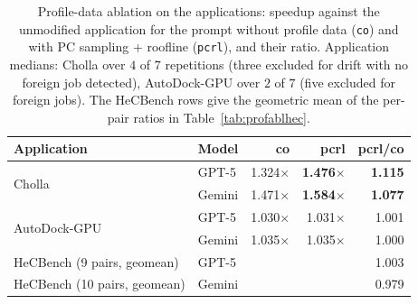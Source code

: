 \begin{table}[t]
\centering
\footnotesize
\caption{Profile-data ablation on the applications: speedup against the unmodified application for
  the prompt without profile data (\texttt{co}) and with PC sampling + roofline (\texttt{pcrl}), and
  their ratio. Application medians: Cholla over $4$ of $7$ repetitions (three excluded for drift with
  no foreign job detected), AutoDock-GPU over $2$ of $7$ (five excluded for foreign jobs). The
  HeCBench rows give the geometric mean of the per-pair ratios in Table~\ref{tab:profablhec}.}
\label{tab:profabl}
\setlength{\tabcolsep}{2pt}
\begin{tabular}{@{}llrrr@{}}
\toprule
\textbf{Application} & \textbf{Model} & \textbf{co} & \textbf{pcrl} & \textbf{pcrl/co} \\
\midrule
\multirow{2}{*}{Cholla}
  & GPT-5  & 1.324$\times$ & \textbf{1.476}$\times$ & \textbf{1.115} \\
  & Gemini & 1.471$\times$ & \textbf{1.584}$\times$ & \textbf{1.077} \\
\midrule
\multirow{2}{*}{AutoDock-GPU}
  & GPT-5  & 1.030$\times$ & 1.031$\times$ & 1.001 \\
  & Gemini & 1.035$\times$ & 1.035$\times$ & 1.000 \\
\midrule
HeCBench (9 pairs, geomean)  & GPT-5  & & & 1.003 \\
HeCBench (10 pairs, geomean) & Gemini & & & 0.979 \\
\bottomrule
\end{tabular}
\end{table}

